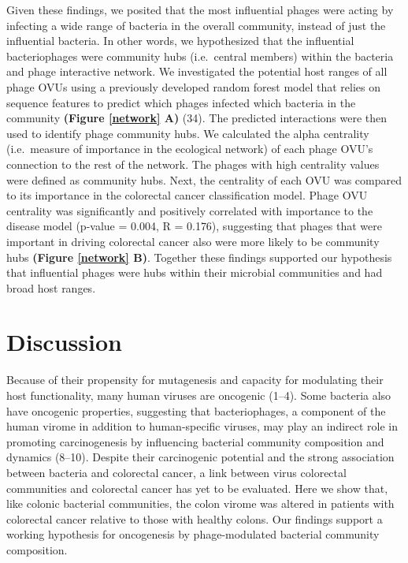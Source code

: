 \documentclass[12pt,]{article}
\begin{document}
Given these findings, we posited that the most influential phages were
acting by infecting a wide range of bacteria in the overall community,
instead of just the influential bacteria. In other words, we
hypothesized that the influential bacteriophages were community hubs
(i.e.~central members) within the bacteria and phage interactive
network. We investigated the potential host ranges of all phage OVUs
using a previously developed random forest model that relies on sequence
features to predict which phages infected which bacteria in the
community \textbf{(Figure \ref{network} A)} (34). The predicted
interactions were then used to identify phage community hubs. We
calculated the alpha centrality (i.e.~measure of importance in the
ecological network) of each phage OVU's connection to the rest of the
network. The phages with high centrality values were defined as
community hubs. Next, the centrality of each OVU was compared to its
importance in the colorectal cancer classification model. Phage OVU
centrality was significantly and positively correlated with importance
to the disease model (p-value = 0.004, R = 0.176), suggesting that
phages that were important in driving colorectal cancer also were more
likely to be community hubs \textbf{(Figure \ref{network} B)}. Together
these findings supported our hypothesis that influential phages were
hubs within their microbial communities and had broad host ranges.

\section{Discussion}\label{discussion}

Because of their propensity for mutagenesis and capacity for modulating
their host functionality, many human viruses are oncogenic (1--4). Some
bacteria also have oncogenic properties, suggesting that bacteriophages,
a component of the human virome in addition to human-specific viruses,
may play an indirect role in promoting carcinogenesis by influencing
bacterial community composition and dynamics (8--10). Despite their
carcinogenic potential and the strong association between bacteria and
colorectal cancer, a link between virus colorectal communities and
colorectal cancer has yet to be evaluated. Here we show that, like
colonic bacterial communities, the colon virome was altered in patients
with colorectal cancer relative to those with healthy colons. Our
findings support a working hypothesis for oncogenesis by phage-modulated
bacterial community composition.
\end{document}
